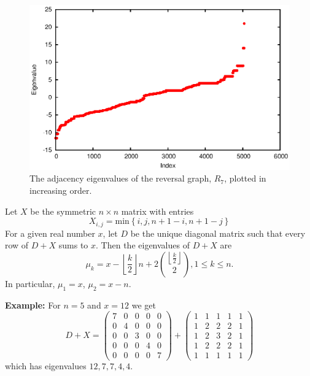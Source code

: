 \begin{figure}[h]
\begin{center}
\includegraphics[scale=.85]{figures/all_spec7.eps} 
\end{center}
\caption{The adjacency eigenvalues of the reversal graph, $R_7$, plotted in increasing order.
  \label{fig-spec7}}
\end{figure}


\begin{lemma}\label{lem:rev_eig}
Let $X$ be the symmetric $n \times n$ matrix with entries
 \[ X_{i,j} = \text{min} \left\{ i,j,n+1-i,n+1-j \right\} \]
For a given real number $x$, let $D$ be the unique diagonal matrix such 
that every row of $D+X$ sums to $x$.  Then the eigenvalues of $D+X$ are
\[ \mu_k =  x - \left\lfloor \frac{k}{2} \right\rfloor n + 2 \binom{\left \lfloor \frac{k}{2} \right \rfloor}{2}, 1 \leq k \leq n . \]
In particular, $\mu_1 = x$, $\mu_2 = x-n$.
\end{lemma}


\noindent \textbf{Example: } For $n=5$ and $x=12$ we get
\[ D+X = \begin{pmatrix}
 7 & 0 & 0 & 0 & 0 \\
 0 & 4 & 0 & 0 & 0 \\
 0 & 0 & 3 & 0 & 0 \\
 0 & 0 & 0 & 4 & 0 \\
 0 & 0 & 0 & 0 & 7 
\end{pmatrix}
+ \begin{pmatrix}
 1 & 1 & 1 & 1 & 1 \\
 1 & 2 & 2 & 2 & 1 \\
 1 & 2 & 3 & 2 & 1 \\
 1 & 2 & 2 & 2 & 1 \\
 1 & 1 & 1 & 1 & 1 
\end{pmatrix} \]
which has eigenvalues $12, 7, 7, 4, 4$.


